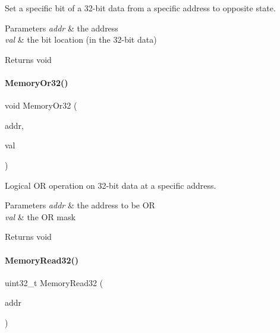 Set a specific bit of a 32-\/bit data from a specific address to opposite state. 


\begin{DoxyParams}{Parameters}
{\em addr} & the address \\
\hline
{\em val} & the bit location (in the 32-\/bit data) \\
\hline
\end{DoxyParams}
\begin{DoxyReturn}{Returns}
void 
\end{DoxyReturn}
\mbox{\label{a00020_a9ea92ebccdef6bdaca4d00210cc7266d}} 
\paragraph{\texorpdfstring{Memory\+Or32()}{MemoryOr32()}}
{\footnotesize\ttfamily void Memory\+Or32 (\begin{DoxyParamCaption}\item[{\mbox{\hyperlink{a00020_a06da901348542a481c297d9b700e2001}{memory\+\_\+addr\+\_\+t}}}]{addr,  }\item[{uint32\+\_\+t}]{val }\end{DoxyParamCaption})\hspace{0.3cm}{\ttfamily [inline]}}



Logical OR operation on 32-\/bit data at a specific address. 


\begin{DoxyParams}{Parameters}
{\em addr} & the address to be OR \\
\hline
{\em val} & the OR mask \\
\hline
\end{DoxyParams}
\begin{DoxyReturn}{Returns}
void 
\end{DoxyReturn}
\mbox{\label{a00020_a706b02571285f92589fbb0b964d7d0bb}} 
\paragraph{\texorpdfstring{Memory\+Read32()}{MemoryRead32()}}
{\footnotesize\ttfamily uint32\+\_\+t Memory\+Read32 (\begin{DoxyParamCaption}\item[{\mbox{\hyperlink{a00020_a06da901348542a481c297d9b700e2001}{memory\+\_\+addr\+\_\+t}}}]{addr }\end{DoxyParamCaption})\hspace{0.3cm}{\ttfamily [inline]}}




